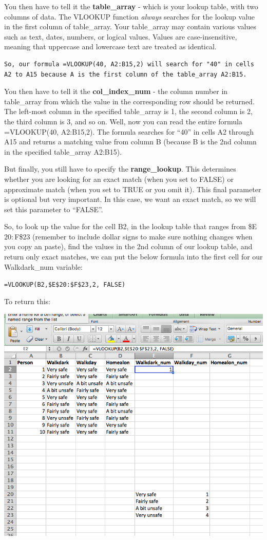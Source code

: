 \documentclass[
]{book}
\begin{document}
You then have to tell it the \textbf{table\_array} - which is your lookup table, with two columns of data. The VLOOKUP function \emph{always} searches for the lookup value in the first column of table\_array. Your table\_array may contain various values such as text, dates, numbers, or logical values. Values are case-insensitive, meaning that uppercase and lowercase text are treated as identical.

\begin{verbatim}
So, our formula =VLOOKUP(40, A2:B15,2) will search for "40" in cells A2 to A15 because A is the first column of the table_array A2:B15. 
\end{verbatim}

You then have to tell it the \textbf{col\_index\_num} - the column number in table\_array from which the value in the corresponding row should be returned. The left-most column in the specified table\_array is 1, the second column is 2, the third column is 3, and so on. Well, now you can read the entire formula =VLOOKUP(40, A2:B15,2). The formula searches for ``40'' in cells A2 through A15 and returns a matching value from column B (because B is the 2nd column in the specified table\_array A2:B15).

But finally, you still have to specify the \textbf{range\_lookup}. This determines whether you are looking for an exact match (when you set to FALSE) or approximate match (when you set to TRUE or you omit it). This final parameter is optional but very important. In this case, we want an exact match, so we will set this parameter to ``FALSE''.

So, to look up the value for the cell B2, in the lookup table that ranges from \$E\(20:\)F\$23 (remember to include dollar signs to make sure nothing changes when you copy an paste), find the values in the 2nd column of our lookup table, and return only exact matches, we can put the below formula into the first cell for our Walkdark\_num variable:

\texttt{=VLOOKUP(B2,\$E\$20:\$F\$23,2,\ FALSE)}

To return this:

\includegraphics{imgs/first_lookup.png}
\end{document}
